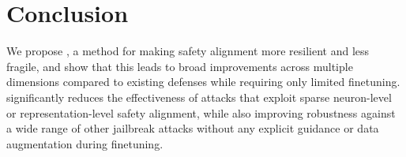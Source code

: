 \section{Conclusion}
\label{sec:conclusion}


We propose \method, a method for making safety alignment more resilient and less fragile, and show that this leads to broad improvements across multiple dimensions compared to existing defenses while requiring only limited finetuning. \method significantly reduces the effectiveness of attacks that exploit sparse neuron-level or representation-level safety alignment, while also improving robustness against a wide range of other jailbreak attacks without any explicit guidance or data augmentation during finetuning.